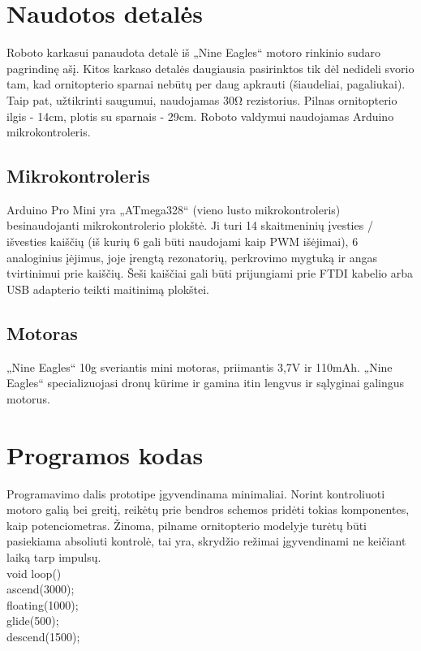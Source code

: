 \documentclass{VUMIFPSkursinis}
\begin{document}
\section{Naudotos detalės}
Roboto karkasui panaudota detalė iš  „Nine Eagles“ motoro rinkinio sudaro pagrindinę ašį. Kitos karkaso detalės daugiausia pasirinktos tik dėl nedideli svorio tam, kad ornitopterio sparnai nebūtų per daug apkrauti (šiaudeliai, pagaliukai). Taip pat, užtikrinti saugumui, naudojamas 30Ω rezistorius. Pilnas ornitopterio ilgis - 14cm, plotis su sparnais - 29cm. 
Roboto valdymui naudojamas Arduino mikrokontroleris.

\subsection{Mikrokontroleris}
Arduino Pro Mini yra „ATmega328“ (vieno lusto mikrokontroleris) besinaudojanti mikrokontrolerio plokštė. Ji turi 14 skaitmeninių įvesties / išvesties kaiščių (iš kurių 6 gali būti naudojami kaip PWM išėjimai), 6 analoginius įėjimus, joje įrengtą rezonatorių, perkrovimo mygtuką ir angas tvirtinimui prie kaiščių. Šeši kaiščiai gali būti prijungiami prie FTDI kabelio arba USB adapterio teikti maitinimą plokštei.\cite{6}

\subsection{Motoras}
„Nine Eagles“ 10g sveriantis mini motoras, priimantis 3,7V ir 110mAh. „Nine Eagles“ specializuojasi dronų kūrime ir gamina itin lengvus ir sąlyginai galingus motorus. 

\section{Programos kodas}

Programavimo dalis prototipe įgyvendinama minimaliai. Norint kontroliuoti motoro galią bei greitį, reikėtų prie bendros schemos pridėti tokias komponentes, kaip potenciometras. Žinoma, pilname ornitopterio modelyje turėtų būti pasiekiama absoliuti kontrolė, tai yra, skrydžio režimai įgyvendinami ne keičiant laiką tarp impulsų.\\

void loop() {\\
	
	ascend(3000);\\
	floating(1000);\\
	glide(500);\\
	descend(1500);\\
}\\
\end{document}
